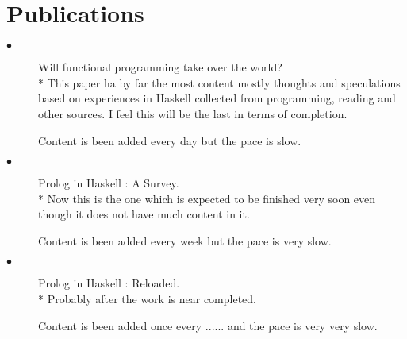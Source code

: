 \documentclass[11pt]{article}
\begin{document}
\section{Publications}
\begin{description}
\item[$\bullet$] Will functional programming take over the world?
\\* This paper ha by far the most content mostly thoughts and speculations based on experiences in Haskell collected from programming, 
reading and other sources. I feel this will be the last in terms of completion.  

Content is been added every day but the pace is slow.

\item[$\bullet$] Prolog in Haskell : A Survey.
\\* Now this is the one which is expected to be finished very soon even though it does not have much content in it.

Content is been added every week but the pace is very slow.

\item[$\bullet$] Prolog in Haskell : Reloaded.
\\* Probably after the work is near completed.

Content is been added once every ......  and the pace is very very slow.

\end{description}
\end{document}
